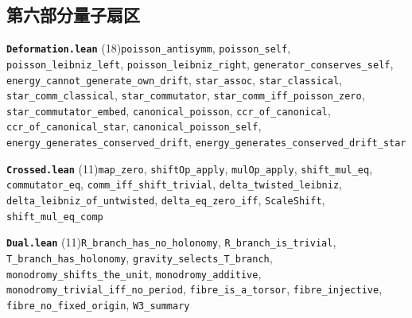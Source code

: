 \documentclass[11pt,a4paper]{article}
\theoremstyle{sudef}
\begin{document}
\subsection*{第六部分\quad 量子扇区}
\noindent\textbf{\texttt{Deformation.lean}} (18)\quad \texttt{poisson\_\allowbreak antisymm}, \texttt{poisson\_\allowbreak self}, \texttt{poisson\_\allowbreak leibniz\_\allowbreak left}, \texttt{poisson\_\allowbreak leibniz\_\allowbreak right}, \texttt{generator\_\allowbreak conserves\_\allowbreak self}, \texttt{energy\_\allowbreak cannot\_\allowbreak generate\_\allowbreak own\_\allowbreak drift}, \texttt{star\_\allowbreak assoc}, \texttt{star\_\allowbreak classical}, \texttt{star\_\allowbreak comm\_\allowbreak classical}, \texttt{star\_\allowbreak commutator}, \texttt{star\_\allowbreak comm\_\allowbreak iff\_\allowbreak poisson\_\allowbreak zero}, \texttt{star\_\allowbreak commutator\_\allowbreak embed}, \texttt{canonical\_\allowbreak poisson}, \texttt{ccr\_\allowbreak of\_\allowbreak canonical}, \texttt{ccr\_\allowbreak of\_\allowbreak canonical\_\allowbreak star}, \texttt{canonical\_\allowbreak poisson\_\allowbreak self}, \texttt{energy\_\allowbreak generates\_\allowbreak conserved\_\allowbreak drift}, \texttt{energy\_\allowbreak generates\_\allowbreak conserved\_\allowbreak drift\_\allowbreak star}\par\smallskip
\noindent\textbf{\texttt{Crossed.lean}} (11)\quad \texttt{map\_\allowbreak zero}, \texttt{shiftOp\_\allowbreak apply}, \texttt{mulOp\_\allowbreak apply}, \texttt{shift\_\allowbreak mul\_\allowbreak eq}, \texttt{commutator\_\allowbreak eq}, \texttt{comm\_\allowbreak iff\_\allowbreak shift\_\allowbreak trivial}, \texttt{delta\_\allowbreak twisted\_\allowbreak leibniz}, \texttt{delta\_\allowbreak leibniz\_\allowbreak of\_\allowbreak untwisted}, \texttt{delta\_\allowbreak eq\_\allowbreak zero\_\allowbreak iff}, \texttt{ScaleShift}, \texttt{shift\_\allowbreak mul\_\allowbreak eq\_\allowbreak comp}\par\smallskip
\noindent\textbf{\texttt{Dual.lean}} (11)\quad \texttt{R\_\allowbreak branch\_\allowbreak has\_\allowbreak no\_\allowbreak holonomy}, \texttt{R\_\allowbreak branch\_\allowbreak is\_\allowbreak trivial}, \texttt{T\_\allowbreak branch\_\allowbreak has\_\allowbreak holonomy}, \texttt{gravity\_\allowbreak selects\_\allowbreak T\_\allowbreak branch}, \texttt{monodromy\_\allowbreak shifts\_\allowbreak the\_\allowbreak unit}, \texttt{monodromy\_\allowbreak additive}, \texttt{monodromy\_\allowbreak trivial\_\allowbreak iff\_\allowbreak no\_\allowbreak period}, \texttt{fibre\_\allowbreak is\_\allowbreak a\_\allowbreak torsor}, \texttt{fibre\_\allowbreak injective}, \texttt{fibre\_\allowbreak no\_\allowbreak fixed\_\allowbreak origin}, \texttt{W3\_\allowbreak summary}\par\smallskip
\end{document}
